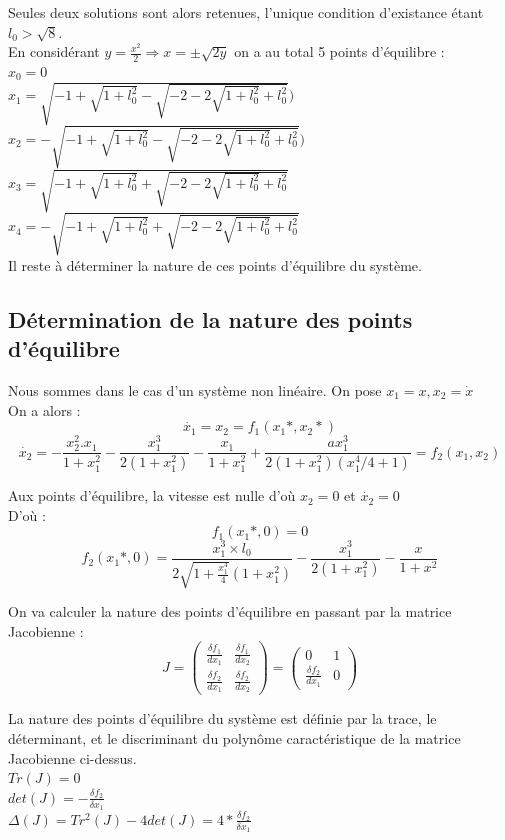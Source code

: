 \documentclass[10pt,a4paper]{article}
\begin{document}
Seules deux solutions sont alors retenues, l'unique condition d'existance étant $l_0>\sqrt{8}$.\\
En considérant $y=\frac{x^2}{2} \Longrightarrow x=\pm \sqrt{2y}$ on a au total 5 points d'équilibre :\\
$x_0=0$\\
$x_1=\sqrt{-1+\sqrt{1+l_0^2}-\sqrt{-2-2\sqrt{1+l_0^2}+l_0^2}})$\\
$x_2=-\sqrt{-1+\sqrt{1+l_0^2}-\sqrt{-2-2\sqrt{1+l_0^2}+l_0^2}})$\\
$x_3=\sqrt{-1+\sqrt{1+l_0^2}+\sqrt{-2-2\sqrt{1+l_0^2}+l_0^2}}$\\
$x_4=-\sqrt{-1+\sqrt{1+l_0^2}+\sqrt{-2-2\sqrt{1+l_0^2}+l_0^2}}$\\
Il reste à déterminer la nature de ces points d'équilibre du système.

\subsection{Détermination de la nature des points d'équilibre}
Nous sommes dans le cas d'un système non linéaire.
On pose $x_1=x, x_2=\dot{x}$\\
On a alors :
\[\dot{x_1}=x_2=f_1(x_1*,x_2*)\]
\[ \dot{x_2}=-\frac{x^2_2.x_1}{1+x^2_1} - \frac{x^3_1}{2(1+x^2_1)} - \frac{x_1}{1+x^2_1} + \frac{ax^3_1}{2(1+x^2_1)(x^4_1/4 + 1)}=f_2(x_1,x_2) \]



Aux points d'équilibre, la vitesse est nulle d'où $x_2=0$ et $\dot{x_2}=0$\\
D'où :\\
\[ f_1(x_1*,0) = 0 \]
\[ f_2(x_1*,0) = \frac{x_1^3\times l_0}{2\sqrt{1+\frac{x_1^4}{4}}(1+x_1^2)}-\frac{x_1^3}{2(1+x_1^2)} - \frac{x}{1+x^2} \]

On va calculer la nature des points d'équilibre en passant par la matrice Jacobienne :\\
\[
J=
\begin{pmatrix}
\frac{\delta f_1}{dx_1} & \frac{\delta f_1}{dx_2} \\
\frac{\delta f_2}{dx_1} & \frac{\delta f_2}{dx_2}
\end{pmatrix}
=
\begin{pmatrix}
0&1\\
\frac{\delta f_2}{dx_1}&0
\end{pmatrix}
\]

La nature des points d'équilibre du système est définie par la trace, le déterminant, et le discriminant du polynôme caractéristique de la matrice Jacobienne ci-dessus.\\
$ Tr(J) = 0 $\\
$ det(J) = -\frac{\delta f_2}{\delta x_1} $\\
$ \Delta(J) = Tr^2(J) - 4det(J) = 4*\frac{\delta f_2}{\delta x_1} $\\
\end{document}
